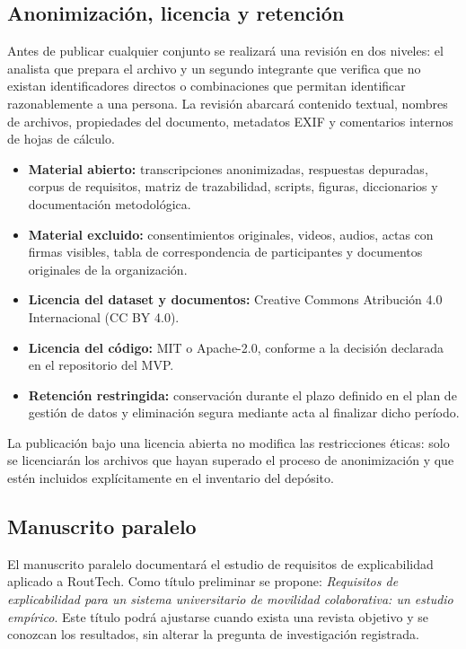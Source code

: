 \documentclass[12pt,a4paper]{article}
\begin{document}
\subsection{Anonimización, licencia y retención}

Antes de publicar cualquier conjunto se realizará una revisión en dos niveles: el analista que prepara el archivo y un segundo integrante que verifica que no existan identificadores directos o combinaciones que permitan identificar razonablemente a una persona. La revisión abarcará contenido textual, nombres de archivos, propiedades del documento, metadatos EXIF y comentarios internos de hojas de cálculo.

\begin{itemize}
  \item \textbf{Material abierto:} transcripciones anonimizadas, respuestas depuradas, corpus de requisitos, matriz de trazabilidad, scripts, figuras, diccionarios y documentación metodológica.
  \item \textbf{Material excluido:} consentimientos originales, videos, audios, actas con firmas visibles, tabla de correspondencia de participantes y documentos originales de la organización.
  \item \textbf{Licencia del dataset y documentos:} Creative Commons Atribución 4.0 Internacional (CC BY 4.0).
  \item \textbf{Licencia del código:} MIT o Apache-2.0, conforme a la decisión declarada en el repositorio del MVP.
  \item \textbf{Retención restringida:} conservación durante el plazo definido en el plan de gestión de datos y eliminación segura mediante acta al finalizar dicho período.
\end{itemize}

La publicación bajo una licencia abierta no modifica las restricciones éticas: solo se licenciarán los archivos que hayan superado el proceso de anonimización y que estén incluidos explícitamente en el inventario del depósito.

\subsection{Manuscrito paralelo}

El manuscrito paralelo documentará el estudio de requisitos de explicabilidad aplicado a RoutTech. Como título preliminar se propone: \textit{Requisitos de explicabilidad para un sistema universitario de movilidad colaborativa: un estudio empírico}. Este título podrá ajustarse cuando exista una revista objetivo y se conozcan los resultados, sin alterar la pregunta de investigación registrada.
\end{document}
